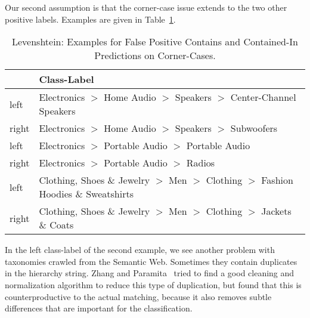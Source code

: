 Our second assumption is that the corner-case issue extends to the two other positive labels.
Examples are given in Table~\ref{tab:levenshtein-error3}.
\begin{table}[htbp]
    \begin{center}
        \begin{tabularx}{\textwidth}{lX}
            & Class-Label\\
            \hline
            left & Electronics $>$ Home Audio $>$ Speakers $>$ Center-Channel Speakers \\
            right & Electronics $>$ Home Audio $>$ Speakers $>$ Subwoofers \\
            \hline
            left & Electronics $>$ Portable Audio $>$ Portable Audio \\
            right & Electronics $>$ Portable Audio $>$ Radios \\
            \hline
            left & Clothing, Shoes \& Jewelry $>$ Men $>$ Clothing $>$ Fashion Hoodies \& Sweatshirts \\
            right & Clothing, Shoes \& Jewelry $>$ Men $>$ Clothing $>$ Jackets \& Coats \\
        \end{tabularx}
        \caption{Levenshtein: Examples for False Positive Contains and Contained-In Predictions on Corner-Cases.}
        \label{tab:levenshtein-error3}
    \end{center}
\end{table}
In the left class-label of the second example, we see another problem with taxonomies crawled from the Semantic Web.
Sometimes they contain duplicates in the hierarchy string.
Zhang and Paramita~\cite{zhang2019product} tried to find a good cleaning and normalization algorithm to reduce this type
of duplication, but found that this is counterproductive to the actual matching, because it also removes subtle differences
that are important for the classification.

